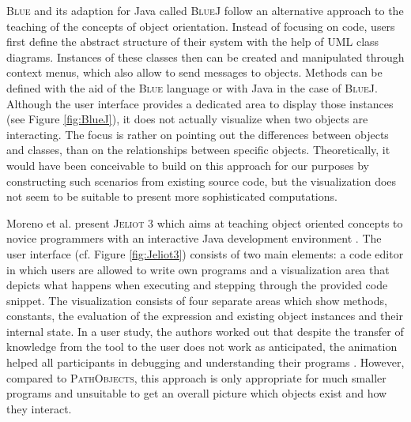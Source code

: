\textsc{Blue} \cite{kolling_object-oriented_1996, kolling_blue_1996} and its adaption for Java called \textsc{BlueJ} \cite{kolling_bluej_2003} follow an alternative approach to the teaching of the concepts of object orientation.
Instead of focusing on code, users first define the abstract structure of their system with the help of UML class diagrams.
Instances of these classes then can be created and manipulated through  context menus, which also allow to send messages to objects.
Methods can be defined with the aid of the \textsc{Blue} language or with Java in the case of \textsc{BlueJ}.
Although the user interface provides a dedicated area to display those instances (see Figure \ref{fig:BlueJ}), it does not actually visualize when two objects are interacting.
The focus is rather on pointing out the differences  between objects and classes, than on the relationships between specific objects.
Theoretically, it would have been conceivable to build on this approach for our purposes by constructing such scenarios from existing source code, but the visualization does not seem to be suitable to present more sophisticated computations.

Moreno et al. present \textsc{Jeliot 3} which aims at teaching object oriented concepts to novice programmers with an interactive Java development environment \cite{moreno_visualizing_2004, bednarik_jeliot_2005}.
The user interface (cf. Figure \ref{fig:Jeliot3}) consists of two main elements: a code editor in which users are allowed to write own programs and a visualization area that depicts what happens when executing and stepping through the provided code snippet.
The visualization consists of four separate areas which show methods, constants, the evaluation of the expression and existing object instances and their internal state.
In a user study, the authors worked out that despite the transfer of knowledge from the tool to the user does not work as anticipated, the animation helped all participants in debugging and understanding their programs \cite{moreno_jeliot_2007}.
However, compared to \textsc{PathObjects}, this approach is only appropriate for much smaller programs and unsuitable to get an overall picture which objects exist and how they interact.